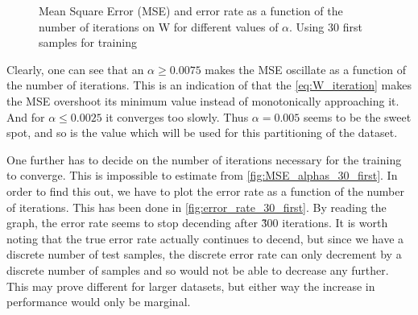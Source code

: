 \documentclass{article}
\begin{document}
\begin{figure}
    \centering
    \caption{Mean Square Error (MSE) and error rate as a function of the number of iterations on W
    for different values of $\alpha$. Using 30 first samples for training}
\end{figure}

Clearly, one can see that an $\alpha \geq 0.0075$ makes the MSE oscillate as a function of the number
of iterations. This is an indication of that the \eqref{eq:W_iteration} makes the MSE overshoot its
minimum value instead of monotonically approaching it. And for $\alpha \leq 0.0025$ it converges
too slowly. Thus $\alpha = 0.005$ seems to be the sweet spot, and so is the value which will be used
for this partitioning of the dataset.

One further has to decide on the number of iterations necessary for the training to converge. This
is impossible to estimate from \autoref{fig:MSE_alphas_30_first}. In order to find this out,
we have to plot the error rate as a function of the number of iterations. This has been done in
\autoref{fig:error_rate_30_first}. By reading the graph, the error rate seems to stop
decending after \~300 iterations. It is worth noting that the true error rate actually continues to
decend, but since we have a discrete number of test samples, the discrete error rate can only decrement
by a discrete number of samples and so would not be able to decrease any further. This may prove
different for larger datasets, but either way the increase in performance would only be marginal.
\end{document}
